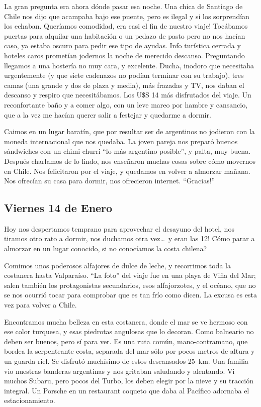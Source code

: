 La gran pregunta era ahora d\'onde pasar esa noche. Una chica de Santiago de
Chile nos dijo que acampaba bajo ese puente, pero es ilegal y si los
sorprend\'ian los echaban. Quer\'iamos comodidad, \textexclamdown era casi el
fin de nuestro viaje! Toc\'abamos puertas para alquilar una habitaci\'on o un
pedazo de pasto pero no nos hac\'ian caso, ya estaba oscuro para pedir ese tipo
de ayudas. Info tur\'istica cerrada y hoteles caros promet\'ian jodernos la
noche de merecido descanso. Preguntando llegamos a una hoster\'ia no muy cara, y
excelente. Ducha, inodoro que necesitaba urgentemente (y que siete cadenazos no
pod\'ian terminar con su trabajo), tres camas (una grande y dos de plaza y
media), m\'as frazadas y {\small TV}, nos daban el descanso y respiro que
necesit\'abamos. Los U\$S 14 m\'as disfrutados del viaje. Un reconfortante
ba\~no y a comer algo, con un leve mareo por hambre y cansancio, que a la vez me
hac\'ian querer salir a festejar y quedarme a dormir.

Caimos en un lugar barat\'in, que por resultar ser de argentinos no jodieron con
la moneda internacional que nos quedaba. La joven pareja nos prepar\'o buenos
s\'andwiches con un chimi-churri ``lo m\'as argentino posible'', y palta, muy
buena. Despu\'es charlamos de lo lindo, nos ense\~naron muchas cosas sobre
c\'omo movernos en Chile. Nos felicitaron por el viaje, y quedamos en volver a
almorzar ma\~nana. Nos ofrec\'ian su casa para dormir, nos ofrecieron internet.
``\textexclamdown Gracias!''

\subsection*{Viernes 14 de Enero}

Hoy nos despertamos temprano para aprovechar el desayuno del hotel, nos tiramos
otro rato a dormir, nos duchamos otra vez\ldots\ \textexclamdown y eran las 12!
\textquestiondown C\'omo parar a almorzar en un lugar conocido, si no
conoc\'iamos la costa chilena?

Comimos unos poderosos alfajores de dulce de leche, y recorrimos toda la
costanera hasta Valpara\'iso. ``La foto'' del viaje fue en una playa de Vi\~na
del Mar; salen tambi\'en los protagonistas secundarios, esos alfajorzotes, y el
oc\'eano, que no se nos ocurri\'o tocar para comprobar que es tan fr\'io como
dicen. La excusa es esta vez para volver a Chile.

Encontramos mucha belleza en esta costanera, donde el mar se ve hermoso con ese
color turquesa, y esas piedrotas angulosas que lo decoran. Como balneario no
deben ser buenos, pero s\'i para ver. Es una ruta com\'un, mano-contramano, que
bordea la serpenteante costa, separada del mar s\'olo por pocos metros de altura
y un guarda riel. Se disfrut\'o much\'isimo de estos descansados 25~km. Una
familia vio nuestras banderas argentinas y nos gritaban saludando y alentando.
Vi muchos Subaru, pero pocos del Turbo, los deben elegir por la nieve y su
tracci\'on integral. Un Porsche en un restaurant coqueto que daba al Pac\'ifico
adornaba el estacionamiento.

